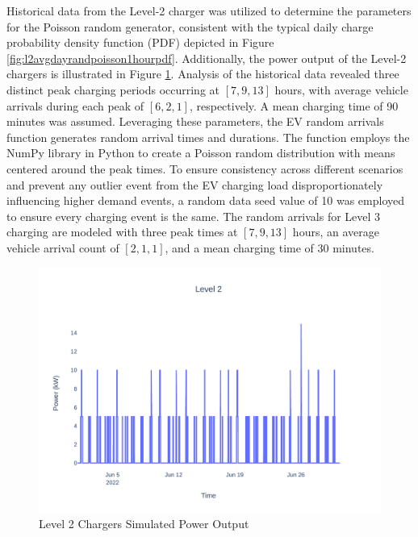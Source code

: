\documentclass[conference]{IEEEtran}
\begin{document}
	Historical data from the Level-2 charger was utilized to determine the parameters for the Poisson random generator, consistent with the typical daily charge probability density function (PDF) depicted in Figure \ref{fig:l2avgdayrandpoisson1hourpdf}. Additionally, the power output of the Level-2 chargers is illustrated in Figure \ref{fig:l2gpadpoissonjune}. Analysis of the historical data revealed three distinct peak charging periods occurring at $[7,9,13]$ hours, with average vehicle arrivals during each peak of $[6,2,1]$, respectively. A mean charging time of 90 minutes was assumed. Leveraging these parameters, the EV random arrivals function generates random arrival times and durations. The function employs the NumPy library in Python to create a Poisson random distribution with means centered around the peak times. To ensure consistency across different scenarios and prevent any outlier event from the EV charging load disproportionately influencing higher demand events, a random data seed value of 10 was employed to ensure every charging event is the same. The random arrivals for Level 3 charging are modeled with three peak times at $[7,9,13]$ hours, an average vehicle arrival count of $[2,1,1]$, and a mean charging time of 30 minutes.
		
			\begin{figure}[H]
				\centering
				\includegraphics[width=1\linewidth]{Fig/l2_g_pad_poisson_June}
				\caption{Level 2 Chargers Simulated Power Output}
				\label{fig:l2gpadpoissonjune}
			\end{figure}
    
\end{document}
